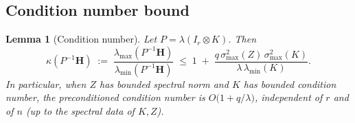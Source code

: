 \documentclass[12pt]{article}
\newtheorem{lemma}[theorem]{Lemma}
\theoremstyle{definition}
\begin{document}
\subsection{Condition number bound}

\begin{lemma}[Condition number]\label{lem:kappa}
Let $P=\lambda(I_r\otimes K)$. Then
\begin{equation}\label{eq:kappa-bound}
\kappa(P^{-1}\mathbf{H}) \;:=\;
\frac{\lambda_{\max}(P^{-1}\mathbf{H})}{\lambda_{\min}(P^{-1}\mathbf{H})}
\;\leq\; 1 \;+\; \frac{q\,\sigma_{\max}^2(Z)\,\sigma_{\max}^2(K)}{\lambda\,\lambda_{\min}(K)}.
\end{equation}
In particular, when $Z$ has bounded spectral norm and $K$ has bounded condition number, the
preconditioned condition number is $O\!\bigl(1+q/\lambda\bigr)$, independent of $r$ and of $n$
(up to the spectral data of $K,Z$).
\end{lemma}
\end{document}
